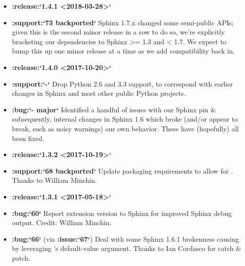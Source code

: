 \documentclass[letterpaper,10pt,english]{sphinxmanual}
\begin{document}
\begin{itemize}
\item {} 
{\color{red}\bfseries{}:release:{}`1.4.1 \textless{}2018-03-28\textgreater{}{}`}

\item {} 
{\color{red}\bfseries{}:support:{}`73 backported{}`} Sphinx 1.7.x changed some semi-public APIs; given
this is the second minor release in a row to do so, we’re explicitly
bracketing our  dependencies to Sphinx \textgreater{}= 1.3 and \textless{} 1.7. We
expect to bump this up one minor release at a time as we add compatibility
back in.

\item {} 
{\color{red}\bfseries{}:release:{}`1.4.0 \textless{}2017-10-20\textgreater{}{}`}

\item {} 
{\color{red}\bfseries{}:support:{}`-{}`} Drop Python 2.6 and 3.3 support, to correspond with earlier
changes in Sphinx and most other public Python projects.

\item {} 
{\color{red}\bfseries{}:bug:{}`- major{}`} Identified a handful of issues with our Sphinx pin \&
subsequently, internal changes in Sphinx 1.6 which broke (and/or appear to
break, such as noisy warnings) our own behavior. These have (hopefully) all
been fixed.

\item {} 
{\color{red}\bfseries{}:release:{}`1.3.2 \textless{}2017-10-19\textgreater{}{}`}

\item {} 
{\color{red}\bfseries{}:support:{}`68 backported{}`} Update packaging requirements to allow for
. Thanks to William Minchin.

\item {} 
{\color{red}\bfseries{}:release:{}`1.3.1 \textless{}2017-05-18\textgreater{}{}`}

\item {} 
{\color{red}\bfseries{}:bug:{}`60{}`} Report extension version to Sphinx for improved Sphinx debug
output. Credit: William Minchin.

\item {} 
{\color{red}\bfseries{}:bug:{}`66{}`} (via {\color{red}\bfseries{}:issue:{}`67{}`}) Deal with some Sphinx 1.6.1 brokenness causing
 by leveraging ’s default-value argument.
Thanks to Ian Cordasco for catch \& patch.


\end{itemize}
\end{document}
